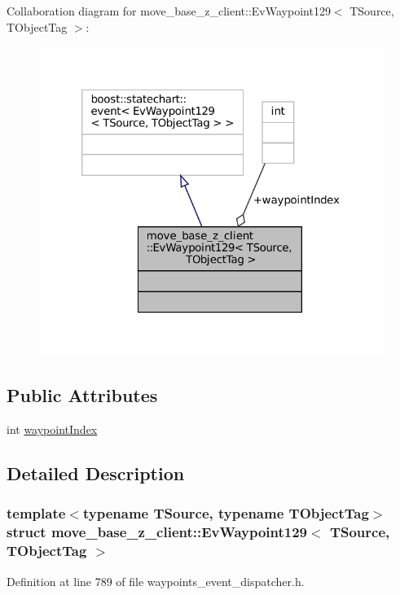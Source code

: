 Collaboration diagram for move\+\_\+base\+\_\+z\+\_\+client\+:\+:Ev\+Waypoint129$<$ T\+Source, T\+Object\+Tag $>$\+:
\nopagebreak
\begin{figure}[H]
\begin{center}
\leavevmode
\includegraphics[width=320pt]{structmove__base__z__client_1_1EvWaypoint129__coll__graph}
\end{center}
\end{figure}
\subsection*{Public Attributes}
\begin{DoxyCompactItemize}
\item 
int \hyperlink{structmove__base__z__client_1_1EvWaypoint129_a0ecc94419950294a532bb537ae99147f}{waypoint\+Index}
\end{DoxyCompactItemize}


\subsection{Detailed Description}
\subsubsection*{template$<$typename T\+Source, typename T\+Object\+Tag$>$\newline
struct move\+\_\+base\+\_\+z\+\_\+client\+::\+Ev\+Waypoint129$<$ T\+Source, T\+Object\+Tag $>$}



Definition at line 789 of file waypoints\+\_\+event\+\_\+dispatcher.\+h.



